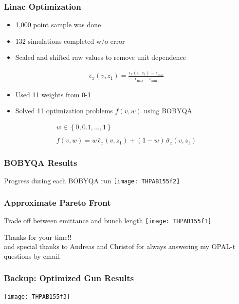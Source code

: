 \documentclass{beamer}
\begin{document}
\begin{frame}
	\frametitle{Linac Optimization}
	 \begin{itemize}
		  	\item{1,000 point sample was done}
		  	\item{132 simulations completed w/o error}
		  	\item{Scaled and shifted raw values to remove unit dependence}
	 \end{itemize}
	 \begin{align*}
	 \bar{\epsilon}_x (v,z_1) = \frac{ \epsilon_x (v,z_1) - \epsilon_{\min} } { \epsilon_{\max} - \epsilon_{\min} }
	 \end{align*}
	 
	 \begin{itemize}
	  	\item{Used 11 weights from 0-1}
	  	\item{Solved 11 optimization problems $f(v,w)$ using BOBYQA}
	 \end{itemize}
	 \begin{gather*}
	 w\in\left\{ 0, 0.1, \ldots, 1 \right\}\\ \\
	 f(v,w) = w \,\bar{\epsilon}_x(v,z_1) + (1-w)\, \bar{\sigma}_z(v,z_1)
	 \end{gather*}
	

\end{frame}

\begin{frame}
	\frametitle{BOBYQA Results}
	Progress during each BOBYQA run
	\texttt{[image: THPAB155f2]}
\end{frame}

\begin{frame}
	\frametitle{Approximate Pareto Front}
	\centering
	Trade off between emittance and bunch length
	\texttt{[image: THPAB155f1]}
\end{frame}


\begin{frame}
		\begin{minipage}{0.5\textwidth}
						
		\end{minipage}%
		\begin{minipage}{0.5\textwidth}
			\begin{center}
	
			\end{center}
		\end{minipage}
\end{frame}


\begin{frame}
	\huge Thanks for your time!!\\ 
	\vskip12pt
	\large and special thanks to Andreas and Christof for always answering my OPAL-t questions by email. 
\end{frame}

\begin{frame}
	\frametitle{Backup: Optimized Gun Results}
	\texttt{[image: THPAB155f3]}
\end{frame}
\end{document}
